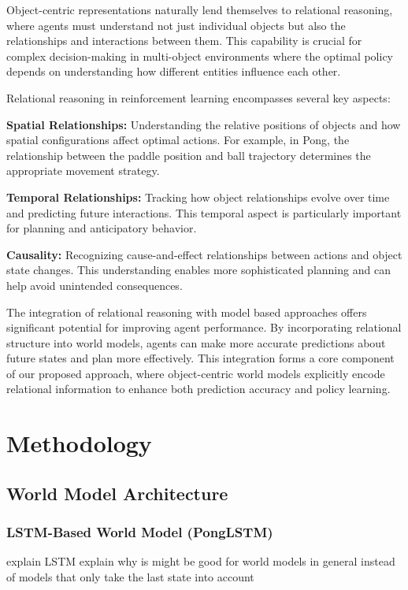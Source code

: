 \documentclass[
	english,
	ruledheaders=section,
	class=report,
	thesis={type=master},
	accentcolor=9c,
	custommargins=true,
	marginpar=false,
	parskip=half-,
	fontsize=11pt,
]{tudapub}
\begin{document}
Object-centric representations naturally lend themselves to relational
reasoning, where agents must understand not just individual objects but also
the relationships and interactions between them. This capability is crucial for
complex decision-making in multi-object environments where the optimal policy
depends on understanding how different entities influence each other.

Relational reasoning in reinforcement learning encompasses several key aspects:

\textbf{Spatial Relationships:} Understanding the relative positions of objects and how spatial configurations affect optimal actions. For example, in Pong, the relationship between the paddle position
and ball trajectory determines the appropriate movement strategy.

\textbf{Temporal Relationships:} Tracking how object relationships evolve over time and predicting future interactions. This temporal aspect is particularly important for planning and anticipatory behavior.

\textbf{Causality:} \cite{scholkopf2021toward,dasgupta2019causal} Recognizing cause-and-effect relationships between actions and object state changes. This understanding enables more sophisticated planning and can help avoid unintended consequences.

The integration of relational reasoning with model based approaches offers
significant potential for improving agent performance. By incorporating
relational structure into world models, agents can make more accurate
predictions about future states and plan more effectively. This integration
forms a core component of our proposed approach, where object-centric world
models explicitly encode relational information to enhance both prediction
accuracy and policy learning.

\chapter{Methodology}
\label{chap:methodology}

\section{World Model Architecture}
\label{sec:world_model_arch}

\subsection{LSTM-Based World Model (PongLSTM)}
\label{subsec:ponglstm}
explain LSTM
explain why is might be good for world models in general instead of models that only take the last state into account
\end{document}
